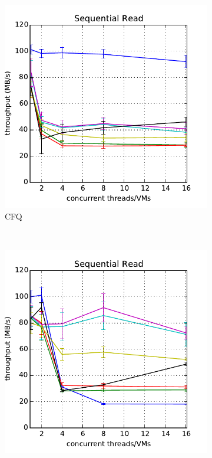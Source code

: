 \documentclass{acmsig}
\begin{document}
\begin{figure}[t]
   \centering
   \begin{subfigure}[b]{0.3\textwidth}
     \includegraphics[width=\textwidth]{figures/throughput_cfq_read.pdf}
     \caption{CFQ}
     \label{fig:aggthroughput_cfq_read}
   \end{subfigure}%
   ~ %
   \begin{subfigure}[b]{0.3\textwidth}
     \includegraphics[width=\textwidth]{figures/throughput_deadline_read.pdf}

\end{subfigure}
\end{figure}
\end{document}
